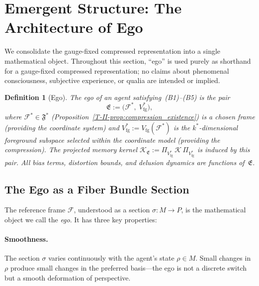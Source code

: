 \documentclass[12pt,a4paper,openany]{book}
\newtheorem{definition}[theorem]{Definition}
\begin{document}
\section{Emergent Structure: The Architecture of Ego}
\label{T-II-sec:architecture}

We consolidate the gauge-fixed compressed representation
into a single mathematical object.
Throughout this section, ``ego'' is used purely as shorthand
for a gauge-fixed compressed representation; no claims about
phenomenal consciousness, subjective experience, or qualia
are intended or implied.

\begin{definition}[Ego]
\label{T-II-def:ego}
The \emph{ego} of an agent satisfying~\textup{(B1)--(B5)}
is the pair
\begin{equation}
\label{T-II-eq:ego}
\mathfrak{E}
:= \bigl(\mathcal{F}^*,\;
   V_{\mathrm{fg}}^*\bigr),
\end{equation}
where $\mathcal{F}^* \in \mathfrak{F}^*$
(Proposition~\ref{T-II-prop:compression_existence}) is a chosen frame
(providing the coordinate system) and
$V_{\mathrm{fg}}^*
:= V_{\mathrm{fg}}(\mathcal{F}^*)$ is the
$k^*$-dimensional foreground subspace selected within the coordinate
model (providing the compression).
The projected memory kernel
$\mathcal{K}_{\mathfrak{E}}
:= \Pi_{V_{\mathrm{fg}}^*}\,\mathcal{K}\,
\Pi_{V_{\mathrm{fg}}^*}$
is induced by this pair.
All bias terms, distortion bounds, and delusion dynamics
are functions of~$\mathfrak{E}$.
\end{definition}

\subsection{The Ego as a Fiber Bundle Section}
\label{T-II-subsec:section}

The reference frame $\mathcal{F}$, understood as a section
$\sigma: M \to P$, is the mathematical object we call the
\emph{ego}.
It has three key properties:

\paragraph{Smoothness.}
The section $\sigma$ varies continuously with the agent's
state $\rho \in M$.
Small changes in $\rho$ produce small changes in the
preferred basis---the ego is not a discrete switch but a
smooth deformation of perspective.
\end{document}
